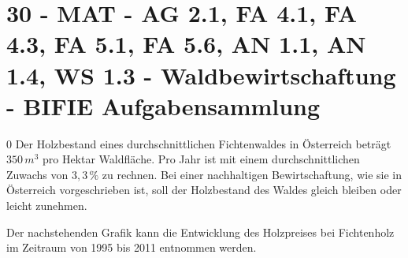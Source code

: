 \section{30 - MAT - AG 2.1, FA 4.1, FA 4.3, FA 5.1, FA 5.6, AN 1.1, AN 1.4, WS 1.3 - Waldbewirtschaftung - BIFIE Aufgabensammlung}

\begin{langesbeispiel} \item[0] %
				Der Holzbestand eines durchschnittlichen Fichtenwaldes in Österreich beträgt $350\,m^3$ pro Hektar Waldfläche. Pro Jahr ist mit einem durchschnittlichen Zuwachs von $3,3\,\%$ zu rechnen. Bei einer nachhaltigen Bewirtschaftung, wie sie in Österreich vorgeschrieben ist, soll der Holzbestand des Waldes gleich bleiben oder leicht zunehmen.
				
Der nachstehenden Grafik kann die Entwicklung des Holzpreises bei Fichtenholz im Zeitraum von 1995 bis 2011 entnommen werden.

\begin{center}

\end{center}
\end{langesbeispiel}
